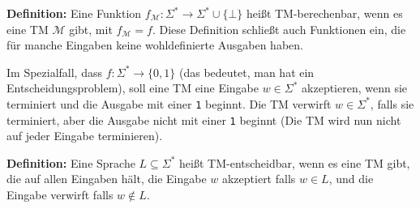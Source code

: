 \documentclass{scrartcl}%
\begin{document}
    \textbf{\textsf{Definition:}} Eine Funktion $f_\mathcal{M} : \Sigma^* \rightarrow \Sigma^* \cup \{  \bot \}$ heißt TM-berechenbar,
    wenn es eine TM $\mathcal{M}$ gibt, mit $f_\mathcal{M} = f$.
    Diese Definition schließt auch Funktionen ein, die für manche Eingaben keine wohldefinierte Ausgaben haben.

    \newpage
    Im Spezialfall, dass $f : \Sigma^* \rightarrow \{0, 1\}$ (das bedeutet, man hat ein Entscheidungsproblem),
    soll eine TM eine Eingabe $w \in \Sigma^*$ akzeptieren, wenn sie terminiert und die Ausgabe mit einer \texttt{1} beginnt.
    Die TM verwirft $w \in \Sigma^*$, falls sie terminiert, aber die Ausgabe nicht mit einer \texttt{1} beginnt
    (Die TM wird nun nicht auf jeder Eingabe terminieren).

    \vspace*{0.3cm}
    \textbf{\textsf{Definition:}} Eine Sprache $L \subseteq \Sigma^*$ heißt TM-entscheidbar, wenn es eine TM gibt,
    die auf allen Eingaben hält, die Eingabe $w$ akzeptiert falls $w \in L$, und die Eingabe verwirft falls $w \notin L$.
\end{document}
